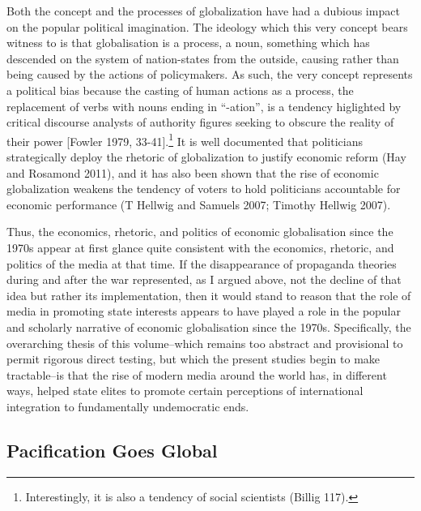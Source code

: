 \documentclass[12pt,book]{article}
\begin{document}
Both the concept and the processes of globalization have had a dubious
impact on the popular political imagination. The ideology which this
very concept bears witness to is that globalisation is a process, a
noun, something which has descended on the system of nation-states from
the outside, causing rather than being caused by the actions of
policymakers. As such, the very concept represents a political bias
because the casting of human actions as a process, the replacement of
verbs with nouns ending in ``-ation'', is a tendency higlighted by
critical discourse analysts of authority figures seeking to obscure the
reality of their power {[}Fowler 1979, 33-41{]}.\footnote{Interestingly,
  it is also a tendency of social scientists (Billig 117).} It is well
documented that politicians strategically deploy the rhetoric of
globalization to justify economic reform (Hay and Rosamond 2011), and it
has also been shown that the rise of economic globalization weakens the
tendency of voters to hold politicians accountable for economic
performance (T Hellwig and Samuels 2007; Timothy Hellwig 2007).

Thus, the economics, rhetoric, and politics of economic globalisation
since the 1970s appear at first glance quite consistent with the
economics, rhetoric, and politics of the media at that time. If the
disappearance of propaganda theories during and after the war
represented, as I argued above, not the decline of that idea but rather
its implementation, then it would stand to reason that the role of media
in promoting state interests appears to have played a role in the
popular and scholarly narrative of economic globalisation since the
1970s. Specifically, the overarching thesis of this volume--which
remains too abstract and provisional to permit rigorous direct testing,
but which the present studies begin to make tractable--is that the rise
of modern media around the world has, in different ways, helped state
elites to promote certain perceptions of international integration to
fundamentally undemocratic ends.

\subsection{Pacification Goes Global}\label{pacification-goes-global}
\end{document}
